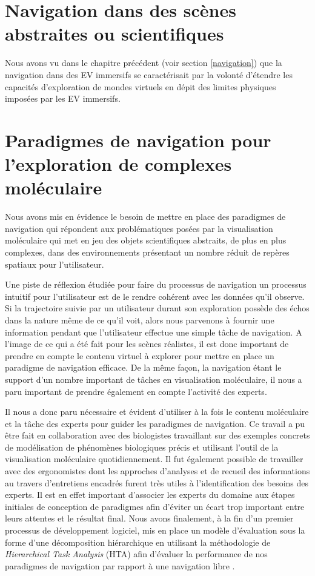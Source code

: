 \section{Navigation dans des scènes abstraites ou scientifiques}

Nous avons vu dans le chapitre précédent (voir section \ref{navigation}) que la navigation dans des EV immersifs se caractérisait par la volonté d'étendre les capacités d'exploration de mondes virtuels en dépit des limites physiques imposées par les EV immersifs.

\section{Paradigmes de navigation pour l'exploration de complexes moléculaire}

Nous avons mis en évidence le besoin de mettre en place des paradigmes de navigation qui répondent aux problématiques posées par la visualisation moléculaire qui met en jeu des objets scientifiques abstraits, de plus en plus complexes, dans des environnements présentant un nombre réduit de repères spatiaux pour l'utilisateur.

Une piste de réflexion étudiée pour faire du processus de navigation un processus intuitif pour l'utilisateur est de le rendre cohérent avec les données qu'il observe. Si la trajectoire suivie par un utilisateur durant son exploration possède des échos dans la nature même de ce qu'il voit, alors nous parvenons à fournir une information pendant que l'utilisateur effectue une simple tâche de navigation. A l'image de ce qui a été fait pour les scènes réalistes, il est donc important de prendre en compte le contenu virtuel à explorer pour mettre en place un paradigme de navigation efficace. De la même façon, la navigation étant le support d'un nombre important de tâches en visualisation moléculaire, il nous a paru important de prendre également en compte l'activité des experts. 

Il nous a donc paru nécessaire et évident d'utiliser à la fois le contenu moléculaire et la tâche des experts pour guider les paradigmes de navigation. Ce travail a pu être fait en collaboration avec des biologistes travaillant sur des exemples concrets de modélisation de phénomènes biologiques précis et utilisant l'outil de la visualisation moléculaire quotidiennement. Il fut également possible de travailler avec des ergonomistes dont les approches d'analyses et de recueil des informations au travers d'entretiens encadrés furent très utiles à l'identification des besoins des experts. Il est en effet important d'associer les experts du domaine aux étapes initiales de conception de paradigmes afin d'éviter un écart trop important entre leurs attentes et le résultat final.
Nous avons finalement, à la fin d'un premier processus de développement logiciel, mis en place un modèle d'évaluation sous la forme d'une décomposition hiérarchique en utilisant la méthodologie de \textit{Hierarchical Task Analysis} (HTA) afin d'évaluer la performance de nos paradigmes de navigation par rapport à une navigation libre \cite{annett2003hierarchical}.

